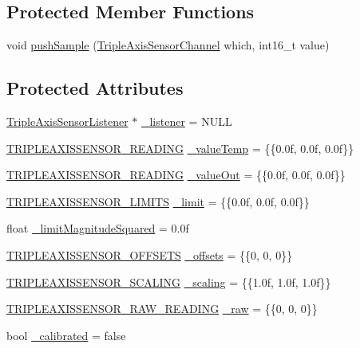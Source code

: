 \subsection*{Protected Member Functions}
\begin{DoxyCompactItemize}
\item 
void \hyperlink{classflame_1_1_triple_axis_sensor_ac61854be2362d25a1d7b86d9afa6355c}{push\-Sample} (\hyperlink{namespaceflame_a626e8c99d0f4f232b95e7089c113095a}{Triple\-Axis\-Sensor\-Channel} which, int16\-\_\-t value)
\end{DoxyCompactItemize}
\subsection*{Protected Attributes}
\begin{DoxyCompactItemize}
\item 
\hyperlink{classflame_1_1_triple_axis_sensor_listener}{Triple\-Axis\-Sensor\-Listener} $\ast$ \hyperlink{classflame_1_1_triple_axis_sensor_a13289e03729649c86021beaf5c5e0279}{\-\_\-listener} = N\-U\-L\-L
\item 
\hyperlink{namespaceflame_a11b86dc8b6fd50d24cec8b9f0259289b}{T\-R\-I\-P\-L\-E\-A\-X\-I\-S\-S\-E\-N\-S\-O\-R\-\_\-\-R\-E\-A\-D\-I\-N\-G} \hyperlink{classflame_1_1_triple_axis_sensor_a5db946bd07a26418e39d5e5f000a8209}{\-\_\-value\-Temp} = \{\{0.\-0f, 0.\-0f, 0.\-0f\}\}
\item 
\hyperlink{namespaceflame_a11b86dc8b6fd50d24cec8b9f0259289b}{T\-R\-I\-P\-L\-E\-A\-X\-I\-S\-S\-E\-N\-S\-O\-R\-\_\-\-R\-E\-A\-D\-I\-N\-G} \hyperlink{classflame_1_1_triple_axis_sensor_aadbb6bb4aa35232bf548c3a9d83ce284}{\-\_\-value\-Out} = \{\{0.\-0f, 0.\-0f, 0.\-0f\}\}
\item 
\hyperlink{namespaceflame_a2b796938428096c98b4073492baf98a6}{T\-R\-I\-P\-L\-E\-A\-X\-I\-S\-S\-E\-N\-S\-O\-R\-\_\-\-L\-I\-M\-I\-T\-S} \hyperlink{classflame_1_1_triple_axis_sensor_ac98b09ee7cf74d16a3f772752d7e1d30}{\-\_\-limit} = \{\{0.\-0f, 0.\-0f, 0.\-0f\}\}
\item 
float \hyperlink{classflame_1_1_triple_axis_sensor_a7e759ec01ad8d2d00038b2edf9fc5913}{\-\_\-limit\-Magnitude\-Squared} = 0.\-0f
\item 
\hyperlink{namespaceflame_a9c63ea08dcbcedfed611f6afdb992301}{T\-R\-I\-P\-L\-E\-A\-X\-I\-S\-S\-E\-N\-S\-O\-R\-\_\-\-O\-F\-F\-S\-E\-T\-S} \hyperlink{classflame_1_1_triple_axis_sensor_af4c80100c14de0069a584217136187af}{\-\_\-offsets} = \{\{0, 0, 0\}\}
\item 
\hyperlink{namespaceflame_a513ac03cc7f92c4b8d7cadb972e6be72}{T\-R\-I\-P\-L\-E\-A\-X\-I\-S\-S\-E\-N\-S\-O\-R\-\_\-\-S\-C\-A\-L\-I\-N\-G} \hyperlink{classflame_1_1_triple_axis_sensor_a79e7f229439c0c0e747a2fa8c30ecaba}{\-\_\-scaling} = \{\{1.\-0f, 1.\-0f, 1.\-0f\}\}
\item 
\hyperlink{namespaceflame_ab883ad815041824ba548753dae327bc2}{T\-R\-I\-P\-L\-E\-A\-X\-I\-S\-S\-E\-N\-S\-O\-R\-\_\-\-R\-A\-W\-\_\-\-R\-E\-A\-D\-I\-N\-G} \hyperlink{classflame_1_1_triple_axis_sensor_af87126ea5a6aeab421e4dec5799e58c9}{\-\_\-raw} = \{\{0, 0, 0\}\}
\item 
bool \hyperlink{classflame_1_1_triple_axis_sensor_af2a25fe4b795d8e4d48045f23d94a217}{\-\_\-calibrated} = false
\end{DoxyCompactItemize}


